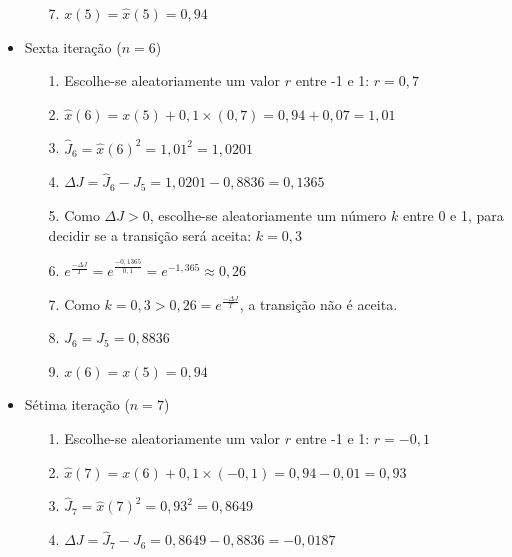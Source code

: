 \documentclass{report}
\begin{document}
\begin{itemize}
\begin{itemize}
\item[7.] $x(5) = \hat{x}(5) = 0,94$

\end{itemize}

\item Sexta iteração ($n = 6$)

\begin{itemize}

\item[1.] Escolhe-se aleatoriamente um valor $r$ entre -1 e 1: $r = 0,7$

\item[2.] $\hat{x}(6) = x(5) + 0,1 \times (0,7) = 0,94 + 0,07 = 1,01$

\item[3.] $\hat{J}_{6} = \hat{x}(6)^2 = 1,01^2 = 1,0201$

\item[4.] $\Delta J = \hat{J}_{6} - J_{5} = 1,0201 - 0,8836 = 0,1365$

\item[5.] Como $\Delta J > 0$, escolhe-se aleatoriamente um número $k$ entre 0 e 1, para decidir se a transição será aceita: $k = 0,3$

\item[6.] $e^{\frac{- \Delta J}{T}} = e^{\frac{- 0,1365}{0,1}} = e^{-1,365} \approx 0,26$

\item[7.] Como $k = 0,3 > 0,26 = e^{\frac{- \Delta J}{T}}$, a transição não é aceita.

\item[8.] $J_{6} = J_{5} = 0,8836$

\item[9.] $x(6) = x(5) = 0,94$

\end{itemize}

\item Sétima iteração ($n = 7$)

\begin{itemize}

\item[1.] Escolhe-se aleatoriamente um valor $r$ entre -1 e 1: $r = -0,1$

\item[2.] $\hat{x}(7) = x(6) + 0,1 \times (-0,1) = 0,94 - 0,01 = 0,93$

\item[3.] $\hat{J}_{7} = \hat{x}(7)^2 = 0,93^2 = 0,8649$

\item[4.] $\Delta J = \hat{J}_{7} - J_{6} = 0,8649 - 0,8836 = -0,0187$


\end{itemize}
\end{itemize}
\end{document}
